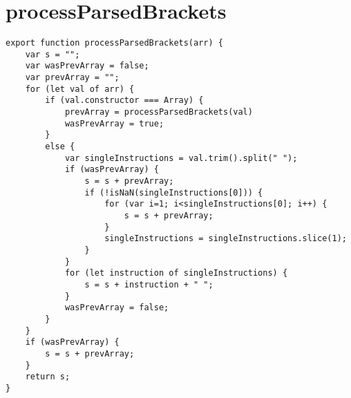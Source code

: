 \documentclass[12pt,a4paper,anyside,openright]{report}
\begin{document}
\section{processParsedBrackets}
\label{appendix:processParsedBrackets}
\begin{lstlisting}[style=js]
export function processParsedBrackets(arr) {
	var s = "";
	var wasPrevArray = false;
	var prevArray = "";
	for (let val of arr) {
		if (val.constructor === Array) {
			prevArray = processParsedBrackets(val)
			wasPrevArray = true;
		}
		else {
			var singleInstructions = val.trim().split(" ");
			if (wasPrevArray) {
				s = s + prevArray;
				if (!isNaN(singleInstructions[0])) {
					for (var i=1; i<singleInstructions[0]; i++) {
						s = s + prevArray;
					}
					singleInstructions = singleInstructions.slice(1);
				}
			}
			for (let instruction of singleInstructions) {
				s = s + instruction + " ";
			}
			wasPrevArray = false;
		}
	}
	if (wasPrevArray) {
		s = s + prevArray;
	}
	return s;
}
\end{lstlisting}




\end{document}
